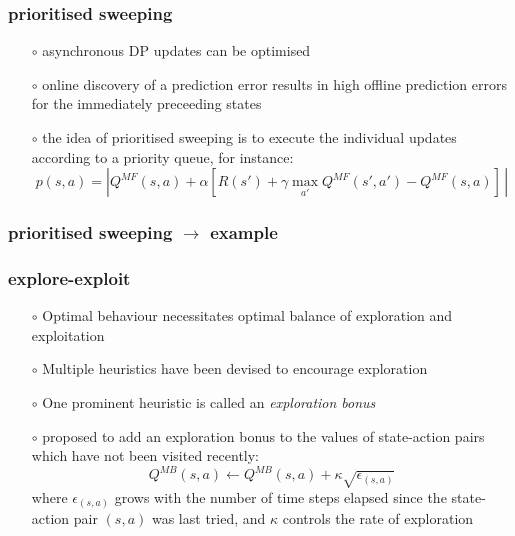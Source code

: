\documentclass[aspectratio=169]{beamer}
\begin{document}
\begin{frame}
    \frametitle{prioritised sweeping} 
    \begin{itemize}
        \item[$\circ$] asynchronous DP updates can be optimised 
        \item[$\circ$] online discovery of a prediction error results in high offline prediction errors for the immediately preceeding states
        \item[$\circ$] the idea of prioritised sweeping \parencite{moorePrioritizedSweepingReinforcement1993} is to execute the individual updates according to a priority queue, for instance:
        $$ p(s, a) = | Q^{MF}(s,a) + \alpha [R(s') + \gamma \max_{a'} Q^{MF}(s', a') - Q^{MF}(s,a)] \,| $$
    \end{itemize}
\end{frame}

\begin{frame}
    \frametitle{prioritised sweeping $\rightarrow$ example} 
\end{frame}

\begin{frame}
    \frametitle{explore-exploit} 
    \begin{itemize}
        \item[$\circ$] Optimal behaviour necessitates optimal balance of exploration and exploitation
        \item[$\circ$] Multiple heuristics have been devised to encourage exploration
        \item[$\circ$] One prominent heuristic is called an \emph{exploration bonus} 
        \item[$\circ$] \citet{suttonDynaIntegratedArchitecture1991} proposed to add an exploration bonus to the values of state-action pairs which have not been visited recently:
        $$ Q^{MB}(s,a) \leftarrow Q^{MB}(s,a) + \kappa \sqrt{\epsilon_{(s,a)}} $$
        where $\epsilon_{(s,a)}$ grows with the number of time steps elapsed since the state-action pair $(s,a)$ was last tried, and 
        $\kappa$ controls the rate of exploration
    \end{itemize}
\end{frame}
\end{document}
